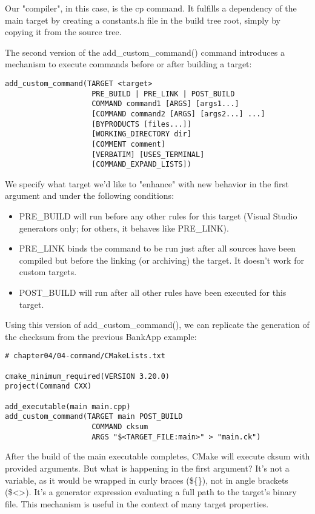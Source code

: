 Our "compiler", in this case, is the cp command. It fulfills a dependency of the main target by creating a constants.h file in the build tree root, simply by copying it from the source tree.


The second version of the add\_custom\_command() command introduces a mechanism to execute commands before or after building a target:

\begin{lstlisting}[style=styleCMake]
add_custom_command(TARGET <target>
					PRE_BUILD | PRE_LINK | POST_BUILD
					COMMAND command1 [ARGS] [args1...]
					[COMMAND command2 [ARGS] [args2...] ...]
					[BYPRODUCTS [files...]]
					[WORKING_DIRECTORY dir]
					[COMMENT comment]
					[VERBATIM] [USES_TERMINAL]
					[COMMAND_EXPAND_LISTS])
\end{lstlisting}

We specify what target we'd like to "enhance" with new behavior in the first argument and under the following conditions:

\begin{itemize}
\item 
PRE\_BUILD will run before any other rules for this target (Visual Studio generators only; for others, it behaves like PRE\_LINK).

\item 
PRE\_LINK binds the command to be run just after all sources have been compiled but before the linking (or archiving) the target. It doesn't work for custom targets.

\item 
POST\_BUILD will run after all other rules have been executed for this target.
\end{itemize}

Using this version of add\_custom\_command(), we can replicate the generation of the checksum from the previous BankApp example:

\begin{lstlisting}[style=styleCMake]
# chapter04/04-command/CMakeLists.txt

cmake_minimum_required(VERSION 3.20.0)
project(Command CXX)

add_executable(main main.cpp)
add_custom_command(TARGET main POST_BUILD
					COMMAND cksum
					ARGS "$<TARGET_FILE:main>" > "main.ck")
\end{lstlisting}

After the build of the main executable completes, CMake will execute cksum with provided arguments. But what is happening in the first argument? It's not a variable, as it would be wrapped in curly braces (\$\{\}), not in angle brackets (\$<>). It's a generator expression evaluating a full path to the target's binary file. This mechanism is useful in the context of many target properties.


